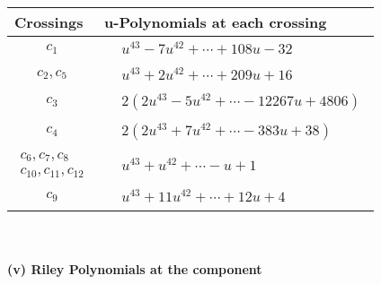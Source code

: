 \documentclass[1p]{elsarticle_modified}
\theoremstyle{definition}
\begin{document}
\begin{tabular}{m{50pt}|m{274pt}}
Crossings & \hspace{64pt}u-Polynomials at each crossing \\
\hline $$\begin{aligned}c_{1}\end{aligned}$$&$\begin{aligned}
&u^{43}-7 u^{42}+\cdots+108 u-32
\end{aligned}$\\
\hline $$\begin{aligned}c_{2},c_{5}\end{aligned}$$&$\begin{aligned}
&u^{43}+2 u^{42}+\cdots+209 u+16
\end{aligned}$\\
\hline $$\begin{aligned}c_{3}\end{aligned}$$&$\begin{aligned}
&2(2 u^{43}-5 u^{42}+\cdots-12267 u+4806)
\end{aligned}$\\
\hline $$\begin{aligned}c_{4}\end{aligned}$$&$\begin{aligned}
&2(2 u^{43}+7 u^{42}+\cdots-383 u+38)
\end{aligned}$\\
\hline $$\begin{aligned}c_{6},c_{7},c_{8}\\c_{10},c_{11},c_{12}\end{aligned}$$&$\begin{aligned}
&u^{43}+u^{42}+\cdots- u+1
\end{aligned}$\\
\hline $$\begin{aligned}c_{9}\end{aligned}$$&$\begin{aligned}
&u^{43}+11 u^{42}+\cdots+12 u+4
\end{aligned}$\\
\hline
\end{tabular}\\~\\
\newpage\renewcommand{\arraystretch}{1}
\flushleft \textbf{(v) Riley Polynomials at the component}\newline \\
\end{document}
